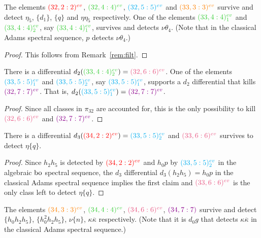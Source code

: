 \noindent

\begin{prop}
The elements $\evr{32}{2}{red}$, $\evr{32}{4}{limegreen}$, $\evr{32}{5}{cyan}$ and $\evr{33}{3}{orange}$ survive and detect $\eta_5$, $\{d_1\}$, $\{q\}$ and $\eta\eta_5$ respectively. One of the elements $\evrm{33}{4}{limegreen}{1}$ and $\evrm{33}{4}{limegreen}{2}$, say $\evrm{33}{4}{limegreen}{1}$, survives and detects $\nu\theta_4$. (Note that in the classical Adams spectral sequence, $p$ detects $\nu\theta_4$.)
\end{prop}

\begin{proof}
This follows from Remark~\ref{rem:filt}.
\end{proof}



\begin{prop}There is a differential
$d_2(\evrm{33}{4}{limegreen}{2})=\evr{32}{6}{lavenderrose}$.
One of the elements $\evrm{33}{5}{cyan}{1}$ and $\evrm{33}{5}{cyan}{2}$, say $\evrm{33}{5}{cyan}{1}$, supports a $d_2$ differential that kills $\evr{32}{7}{darkmagenta}$. That is, $d_2(\evrm{33}{5}{cyan}{1})=\evr{32}{7}{darkmagenta}$.
\end{prop}

\begin{proof}
Since all classes in $\pi_{32}$ are accounted for, this is the only possibility to kill $\evr{32}{6}{lavenderrose}$ and $\evr{32}{7}{darkmagenta}$.
\end{proof}


\begin{prop}
There is a differential $d_3(\evr{34}{2}{red})=\evrm{33}{5}{cyan}{2}$ and $\evr{33}{6}{lavenderrose}$ survives to detect $\eta\{q\}$.
\end{prop}
\begin{proof}
Since $h_2h_5$ is detected by $\evr{34}{2}{red}$ and $h_0 p$ by $\evrm{33}{5}{cyan}{2}$ in the algebraic $\bo$ spectral sequence, the $d_3$ differential $d_3(h_2h_5) = h_0p$ in the classical Adams spectral sequence implies the first claim and $\evr{33}{6}{lavenderrose}$ is the only class left to detect $\eta\{q\}$. 
\end{proof}



\begin{cor}
The elements $\evr{34}{3}{orange}$, $\evr{34}{4}{limegreen}$, $\evr{34}{6}{lavenderrose}$, $\gdr{34}{7}{7}{darkmagenta}$ survive and detect $\{h_0h_2h_5\}$, $\{h_0^2h_2h_5\}$, $\nu\{n\}$, $\kappa\overline{\kappa}$ respectively. (Note that it is $d_0g$ that detects $\kappa\overline{\kappa}$ in the classical Adams spectral sequence.)
\end{cor}




